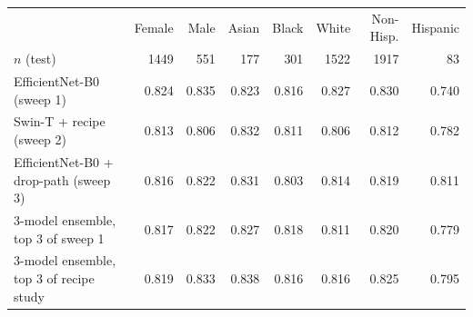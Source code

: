 \begin{tabular}{lrrrrrrr}
\toprule
 & Female & Male & Asian & Black & White & Non-Hisp. & Hispanic \\
$n$ (test) & 1449 & 551 & 177 & 301 & 1522 & 1917 & 83 \\
\midrule
EfficientNet-B0 (sweep 1) & 0.824 & 0.835 & 0.823 & 0.816 & 0.827 & 0.830 & 0.740 \\
Swin-T + recipe (sweep 2) & 0.813 & 0.806 & 0.832 & 0.811 & 0.806 & 0.812 & 0.782 \\
EfficientNet-B0 + drop-path (sweep 3) & 0.816 & 0.822 & 0.831 & 0.803 & 0.814 & 0.819 & 0.811 \\
3-model ensemble, top 3 of sweep 1 & 0.817 & 0.822 & 0.827 & 0.818 & 0.811 & 0.820 & 0.779 \\
3-model ensemble, top 3 of recipe study & 0.819 & 0.833 & 0.838 & 0.816 & 0.816 & 0.825 & 0.795 \\
\bottomrule
\end{tabular}
